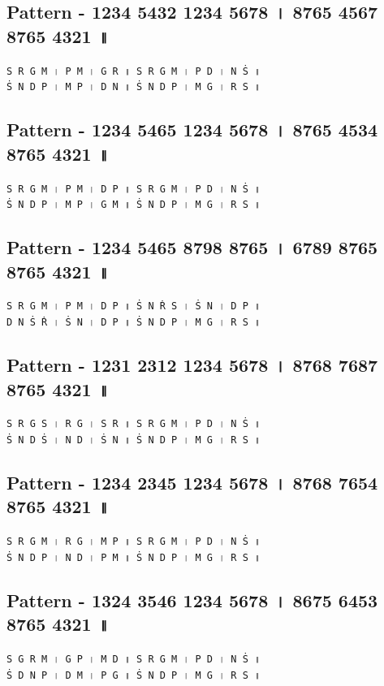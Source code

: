 \documentclass[12pt]{article}
\newcommand{\df}[1]{{\devanagarifont#1}}
\begin{document}
\subsection{Pattern - 1234 5432 1234 5678 \df{।} 8765 4567 8765 4321 \df{॥}}
\texttt{S~R~G~M~\df{।}~P~M~\df{।}~G~R~\df{॥}~S~R~G~M~\df{।}~P~D~\df{।}~N~Ṡ~\df{॥}}\\
\texttt{Ṡ~N~D~P~\df{।}~M~P~\df{।}~D~N~\df{॥}~Ṡ~N~D~P~\df{।}~M~G~\df{।}~R~S~\df{॥}}\\
\subsection{Pattern - 1234 5465 1234 5678 \df{।} 8765 4534 8765 4321 \df{॥}}
\texttt{S~R~G~M~\df{।}~P~M~\df{।}~D~P~\df{॥}~S~R~G~M~\df{।}~P~D~\df{।}~N~Ṡ~\df{॥}}\\
\texttt{Ṡ~N~D~P~\df{।}~M~P~\df{।}~G~M~\df{॥}~Ṡ~N~D~P~\df{।}~M~G~\df{।}~R~S~\df{॥}}\\
\subsection{Pattern - 1234 5465 8798 8765 \df{।} 6789 8765 8765 4321 \df{॥}}
\texttt{S~R~G~M~\df{।}~P~M~\df{।}~D~P~\df{॥}~Ṡ~N~Ṙ~S~\df{।}~Ṡ~N~\df{।}~D~P~\df{॥}}\\
\texttt{D~N~Ṡ~Ṙ~\df{।}~Ṡ~N~\df{।}~D~P~\df{॥}~Ṡ~N~D~P~\df{।}~M~G~\df{।}~R~S~\df{॥}}\\
\subsection{Pattern - 1231 2312 1234 5678 \df{।} 8768 7687 8765 4321 \df{॥}}
\texttt{S~R~G~S~\df{।}~R~G~\df{।}~S~R~\df{॥}~S~R~G~M~\df{।}~P~D~\df{।}~N~Ṡ~\df{॥}}\\
\texttt{Ṡ~N~D~Ṡ~\df{।}~N~D~\df{।}~Ṡ~N~\df{॥}~Ṡ~N~D~P~\df{।}~M~G~\df{।}~R~S~\df{॥}}\\
\subsection{Pattern - 1234 2345 1234 5678 \df{।} 8768 7654 8765 4321 \df{॥}}
\texttt{S~R~G~M~\df{।}~R~G~\df{।}~M~P~\df{॥}~S~R~G~M~\df{।}~P~D~\df{।}~N~Ṡ~\df{॥}}\\
\texttt{Ṡ~N~D~P~\df{।}~N~D~\df{।}~P~M~\df{॥}~Ṡ~N~D~P~\df{।}~M~G~\df{।}~R~S~\df{॥}}\\
\subsection{Pattern - 1324 3546 1234 5678 \df{।} 8675 6453 8765 4321 \df{॥}}
\texttt{S~G~R~M~\df{।}~G~P~\df{।}~M~D~\df{॥}~S~R~G~M~\df{।}~P~D~\df{।}~N~Ṡ~\df{॥}}\\
\texttt{Ṡ~D~N~P~\df{।}~D~M~\df{।}~P~G~\df{॥}~Ṡ~N~D~P~\df{।}~M~G~\df{।}~R~S~\df{॥}}\\
\end{document}
